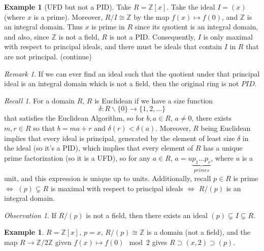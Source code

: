\documentclass[12pt]{article}
\theoremstyle{definition}
\newtheorem{eg}[thm]{Example}
\theoremstyle{remark}
\newtheorem{rmk}[thm]{Remark}
\newtheorem{obs}[thm]{Observation}
\newtheorem*{rec}{Recall}
\numberwithin{equation}{section}
\newcommand\Z{\mathbb Z}    %
\begin{document}
\begin{eg}[UFD but not a PID]
        Take $R = \Z[x]$. Take the ideal $I = (x)$ (where $x$ is a prime). Moreover, $R/I \cong \Z$ by the map $f(x) \mapsto f(0)$, and $\Z$ is an integral domain. Thus $x$ is prime in $R$ since its quotient is an integral domain, and also, since $\Z$ is not a field, $R$ is not a PID. Consequently, $I$ is only maximal with respect to principal ideals, and there must be ideals that contain $I$ in $R$ that are not principal. (continue)
\end{eg}

\vspace{15pt}

\begin{rmk}
        If we can ever find an ideal such that the quotient under that principal ideal is an integral domain which is not a field, then the original ring is not $PID$.
\end{rmk}


\vspace{15pt}

\begin{rec}
        For a domain $R$, $R$ is Euclidean if we have a size function \begin{equation}
                \delta:R\backslash \{0\}\rightarrow \{1,2,...\}
        \end{equation}
        that satisfies the Euclidean Algorithm, so for $b,a \in R$, $a \neq 0$, there exists $m,r \in R$ so that $b = ma + r$ and $\delta(r) < \delta(a)$. Moreover, $R$ being Euclidean implies that every ideal is principal, generated by the element of least size $\delta$ in the ideal (so it's a PID), which implies that every element of $R$ has a unique prime factorization (so it is a UFD), so for any $a \in R$, $a = u\underbrace{p_1...p_r}_{primes}$, where $u$ is a unit, and this expression is unique up to units. Additionally, recall $p \in R$ is prime $\iff$ $(p) \subsetneq R$ is maximal with respect to principal ideals $\iff$ $R/(p)$ is an integral domain.
\end{rec}

\vspace{15pt}

\begin{obs}
        If $R/(p)$ is not a field, then there exists an ideal $(p) \subsetneq I\subsetneq R$.
\end{obs}

\vspace{15pt}

\begin{eg}
        $R = \Z[x]$, $p = x$, $R/(p) \cong \Z$ is a domain (not a field), and the map $R\rightarrow \Z/2\Z$ given $f(x) \mapsto f(0) \mod 2$ gives $R \supset (x,2) \supset (p)$.
\end{eg}
\end{document}
